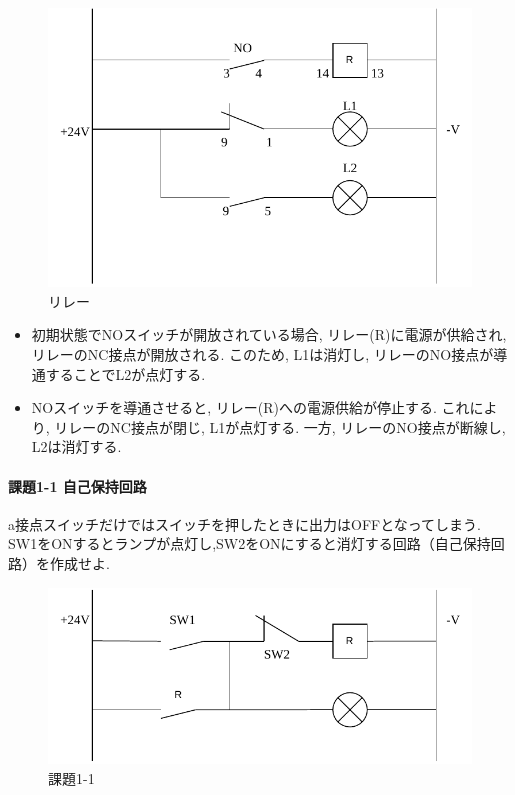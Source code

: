 \begin{figure}[H]
  \centering
  \includegraphics[scale=0.5]{sozai/1_compressed.pdf}
  \caption{リレー}
\end{figure}

\begin{itemize}
  \item 初期状態でNOスイッチが開放されている場合, リレー(R)に電源が供給され, リレーのNC接点が開放される. このため, L1は消灯し, リレーのNO接点が導通することでL2が点灯する.
  \item NOスイッチを導通させると, リレー(R)への電源供給が停止する. これにより, リレーのNC接点が閉じ, L1が点灯する. 一方, リレーのNO接点が断線し, L2は消灯する.
\end{itemize}

\paragraph{課題1-1 自己保持回路}
a接点スイッチだけではスイッチを押したときに出力はOFFとなってしまう.
SW1をONするとランプが点灯し,SW2をONにすると消灯する回路（自己保持回路）を作成せよ.\\

\begin{figure}[H]
  \centering
  \includegraphics[scale=0.7]{sozai/14.pdf}
  \caption{課題1-1}
\end{figure}

